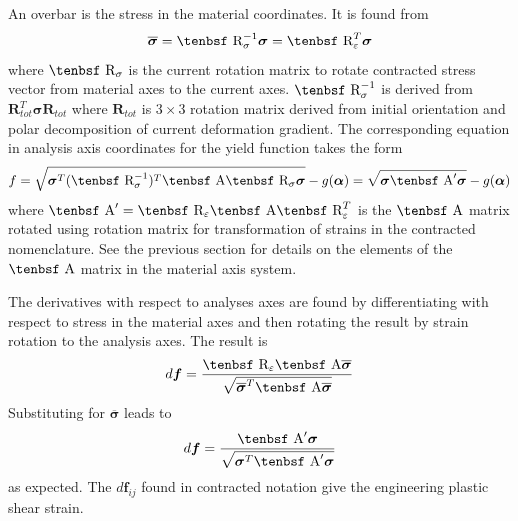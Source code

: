 \documentclass[11pt]{book}
\renewcommand{\vec}[1]{\boldsymbol{#1}}
\def\A{\hbox{\tenbsf A}}
\def\df{d \vec{f}}
\def\R{\hbox{\tenbsf R}}
\begin{document}
An overbar is the stress in the material coordinates. It is found from
\begin{equation}
     \overline{\vec\sigma} =  \R_\sigma^{-1}\vec\sigma = \R_\varepsilon^T\vec\sigma
\end{equation}
where $\R_\sigma$ is the current rotation matrix to rotate contracted stress vector from material axes to the current axes. $\R_\sigma^{-1}$ is derived from $\vec R_{tot}^T\vec\sigma\vec R_{tot}$ where $\vec R_{tot}$ is $3\times3$ rotation matrix derived from initial orientation and polar decomposition of current deformation gradient.
The corresponding equation in analysis axis coordinates for the yield function takes the form
\begin{equation}
     f = \sqrt{\vec\sigma^T (\R_\sigma^{-1})^T\A \R_\sigma\vec\sigma} - g(\vec\alpha) = \sqrt{\vec\sigma \A' \vec\sigma} - g(\vec\alpha)     \label{fanaleq}
\end{equation}
where $\A' = \R_\varepsilon\A\R_\varepsilon^T$ is the $\A$ matrix rotated using rotation matrix for transformation of strains in the contracted nomenclature. See the previous section for details on the elements of the $\A$ matrix in the material axis system.

The derivatives with respect to analyses axes are found by differentiating with respect to stress in the material axes and then rotating the result by strain rotation  to the analysis axes. The result is
\begin{equation}
         \df = {\R_\varepsilon\A \overline{\vec\sigma}\over\sqrt{\overline{\vec\sigma}^T\A \overline{\vec\sigma}}} \end{equation}
Substituting for $\overline{\vec\sigma}$ leads to
\begin{equation}
   \df = {\A' \vec\sigma\over\sqrt{\vec\sigma^T \A' \vec\sigma}} 
\end{equation}
as expected. The $\df_{ij}$ found in contracted notation give the engineering plastic shear strain.
\end{document}
